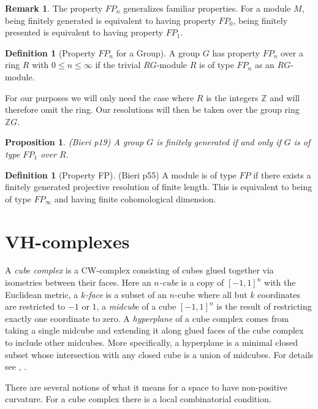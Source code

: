 \documentclass[12pt,parskip=full]{report}
\theoremstyle{plain}
\newtheorem{prop}[thm]{Proposition}
\theoremstyle{definition}
\newtheorem{rmk}[thm]{Remark}
\newtheorem{dfn}[thm]{Definition}
\begin{document}
\begin{rmk}
The property \(FP_n\) generalizes familiar properties. For a module \(M\), being finitely generated is equivalent to having property \(FP_0\), being finitely presented is equivalent to having property \(FP_1\).
\end{rmk}

\begin{dfn}
[Property \(FP_n\) for a Group]

A group \(G\) has property \(FP_n\) over a ring \(R\) with \(0\leq n\leq \infty\) if the trivial \(RG\)-module \(R\) is of type \(FP_n\) as an \(RG\)-module.
\end{dfn}

For our purposes we will only need the case where \(R\) is the integers \(\mathbb{Z}\) and will therefore omit the ring. Our resolutions will then be taken over the group ring \(\mathbb{Z}G\).

\begin{prop}
(Bieri p19)
A group \(G\) is finitely generated if and only if \(G\) is of type \(FP_1\) over \(R\).
\end{prop}

\begin{dfn}
[Property FP]
(Bieri p55)
A module is of type \(FP\) if there exists a finitely generated projective resolution of finite length. This is equivalent to being of type \(FP_\infty\) and having finite cohomological dimension.
\end{dfn}

\section{VH-complexes}

A \emph{cube complex} is a CW-complex consisting of cubes glued together via isometries between their faces. Here an \emph{\(n\)-cube} is a copy of \([-1,1]^n\) with the Euclidean metric, a \emph{\(k\)-face} is a subset of an \(n\)-cube where all but \(k\) coordinates are restricted to \(-1\) or \(1\), a \emph{midcube} of a cube \([-1,1]^n\) is the result of restricting exactly one coordinate to zero. A \emph{hyperplane} of a cube complex comes from taking a single midcube and extending it along glued faces of the cube complex to include other midcubes. More specifically, a hyperplane is a minimal closed subset whose intersection with any closed cube is a union of midcubes. For details see \cite{manning}, \cite{haglundwise}.

There are several notions of what it means for a space to have non-positive curvature. For a cube complex there is a local combinatorial condition.
\end{document}

